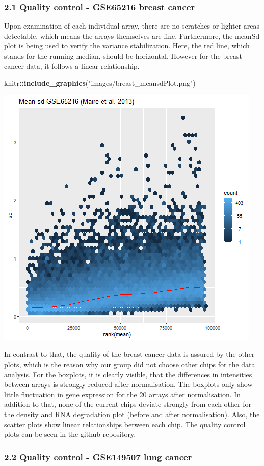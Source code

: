 \documentclass[
]{article}
\newenvironment{Shaded}{\begin{snugshade}}{\end{snugshade}}
\newcommand{\KeywordTok}[1]{\textcolor[rgb]{0.13,0.29,0.53}{\textbf{#1}}}
\newcommand{\NormalTok}[1]{#1}
\newcommand{\OperatorTok}[1]{\textcolor[rgb]{0.81,0.36,0.00}{\textbf{#1}}}
\newcommand{\StringTok}[1]{\textcolor[rgb]{0.31,0.60,0.02}{#1}}
\begin{document}
\hypertarget{quality-control---gse65216-breast-cancer}{%
\subsubsection{2.1 Quality control - GSE65216 breast
cancer}\label{quality-control---gse65216-breast-cancer}}

Upon examination of each individual array, there are no scratches or
lighter areas detectable, which means the arrays themselves are fine.
Furthermore, the meanSd plot is being used to verify the variance
stabilization. Here, the red line, which stands for the running median,
should be horizontal. However for the breast cancer data, it follows a
linear relationship.

\begin{Shaded}
\begin{Highlighting}[]
\NormalTok{knitr}\OperatorTok{::}\KeywordTok{include_graphics}\NormalTok{(}\StringTok{"images/breast_meansdPlot.png"}\NormalTok{)}
\end{Highlighting}
\end{Shaded}

\includegraphics[width=0.3\linewidth,style="float:right; padding:10px"]{images/breast_meansdPlot}

In contrast to that, the quality of the breast cancer data is assured by
the other plots, which is the reason why our group did not choose other
chips for the data analysis. For the boxplots, it is clearly visible,
that the differences in intensities between arrays is strongly reduced
after normalisation. The boxplots only show little fluctuation in gene
expression for the 20 arrays after normalisation. In addition to that,
none of the current chips deviate strongly from each other for the
density and RNA degradation plot (before and after normalisation). Also,
the scatter plots show linear relationships between each chip. The
quality control plots can be seen in the github repository.

\hypertarget{quality-control---gse149507-lung-cancer}{%
\subsubsection{2.2 Quality control - GSE149507 lung
cancer}\label{quality-control---gse149507-lung-cancer}}
\end{document}
